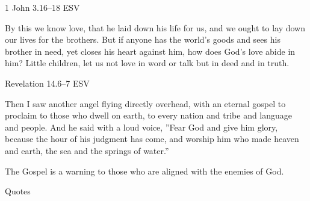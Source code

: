 \documentclass[
]{article}
\newcommand{\RL}[1]{\beginR #1\endR}
\begin{document}
1 John 3.16--18 ESV

By this we know love, that he laid down his life for us, and we ought to
lay down our lives for the brothers. But if anyone has the world\RL{'}s
goods and sees his brother in need, yet closes his heart against him,
how does God\RL{'}s love abide in him? Little children, let us not love
in word or talk but in deed and in truth.

Revelation 14.6--7 ESV

Then I saw another angel flying directly overhead, with an eternal
gospel to proclaim to those who dwell on earth, to every nation and
tribe and language and people. And he said with a loud voice,
\RL{''}Fear God and give him glory, because the hour of his judgment has
come, and worship him who made heaven and earth, the sea and the springs
of water.''

The Gospel is a warning to those who are aligned with the enemies of
God.

Quotes
\end{document}

